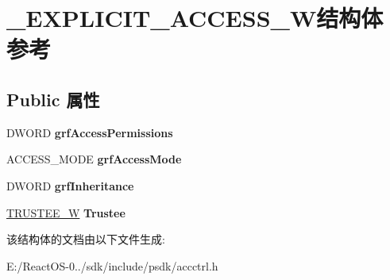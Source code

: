 \hypertarget{struct___e_x_p_l_i_c_i_t___a_c_c_e_s_s___w}{}\section{\+\_\+\+E\+X\+P\+L\+I\+C\+I\+T\+\_\+\+A\+C\+C\+E\+S\+S\+\_\+\+W结构体 参考}
\label{struct___e_x_p_l_i_c_i_t___a_c_c_e_s_s___w}
\subsection*{Public 属性}
\begin{DoxyCompactItemize}
\item 
\mbox{\label{struct___e_x_p_l_i_c_i_t___a_c_c_e_s_s___w_a062d0889e28298e4529e2ab2fff7e6a2}} 
D\+W\+O\+RD {\bfseries grf\+Access\+Permissions}
\item 
\mbox{\label{struct___e_x_p_l_i_c_i_t___a_c_c_e_s_s___w_ae0bf3c8e193c47458644563b7b0fae62}} 
A\+C\+C\+E\+S\+S\+\_\+\+M\+O\+DE {\bfseries grf\+Access\+Mode}
\item 
\mbox{\label{struct___e_x_p_l_i_c_i_t___a_c_c_e_s_s___w_ab65bb01eb4e1fd09e71a978bda4693af}} 
D\+W\+O\+RD {\bfseries grf\+Inheritance}
\item 
\mbox{\label{struct___e_x_p_l_i_c_i_t___a_c_c_e_s_s___w_aba4172eed7f71e40bc1dcdace676dacd}} 
\hyperlink{struct___t_r_u_s_t_e_e___w}{T\+R\+U\+S\+T\+E\+E\+\_\+W} {\bfseries Trustee}
\end{DoxyCompactItemize}


该结构体的文档由以下文件生成\+:\begin{DoxyCompactItemize}
\item 
E\+:/\+React\+O\+S-\/0../sdk/include/psdk/accctrl.\+h\end{DoxyCompactItemize}
